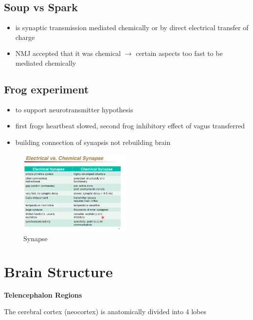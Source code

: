 \documentclass{article}
\begin{document}
\subsection{Soup vs Spark}

\begin{itemize}
    \item is synaptic transmission mediated chemically or by direct electrical transfer of charge
    \item NMJ accepted that it was chemical $\rightarrow$ certain aspects too fast to be mediated chemically
\end{itemize}

\subsection{Frog experiment}

\begin{itemize}
    \item to support neurotransmitter hypothesis
    \item first frogs heartbeat slowed, second frog inhibitory effect of vagus transferred
    \item building connection of synapsis not rebuilding brain
\end{itemize}

\begin{figure}[H]
    \centering
    \includegraphics[width=0.5\textwidth]{assets/synapse.png}
    \caption{Synapse}
    \end{figure}
    
    \section{Brain Structure}
    
    \noindent \textbf{Telencephalon Regions}
    
    The cerebral cortex (neocortex) is anatomically divided into 4 lobes
    
\end{document}
